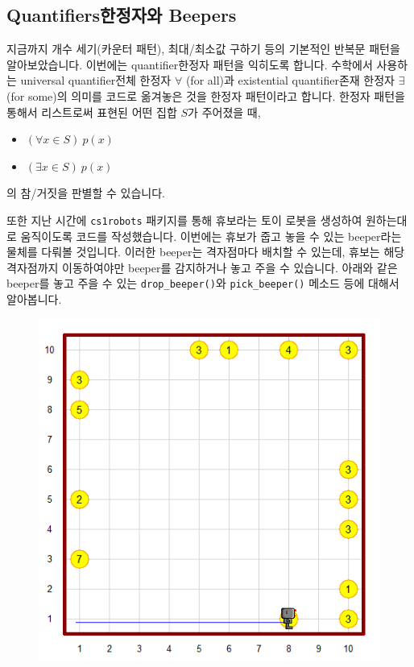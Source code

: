 \documentclass[../main.tex]{subfiles}
\begin{document}
\subsection{Quantifiers한정자와 Beepers}
지금까지 개수 세기(카운터 패턴), 최대/최소값 구하기 등의 기본적인 반복문 패턴을 알아보았습니다.
이번에는 quantifier한정자 패턴을 익히도록 합니다.
수학에서 사용하는 universal quantifier전체 한정자 $\forall$ (for all)과 existential quantifier존재 한정자 $\exists$ (for some)의 의미를 코드로 옮겨놓은 것을 한정자 패턴이라고 합니다.
한정자 패턴을 통해서 리스트로써 표현된 어떤 집합 $S$가 주어졌을 때,
\begin{itemize}
\item $(\forall x \in S)\ p(x)$
\item $(\exists x \in S)\ p(x)$
\end{itemize}
의 참/거짓을 판별할 수 있습니다.

또한 지난 시간에 \texttt{cs1robots} 패키지를 통해 휴보라는 토이 로봇을 생성하여 원하는대로 움직이도록 코드를 작성했습니다.
이번에는 휴보가 줍고 놓을 수 있는 beeper라는 물체를 다뤄볼 것입니다.
이러한 beeper는 격자점마다 배치할 수 있는데, 휴보는 해당 격자점까지 이동하여야만 beeper를 감지하거나 놓고 주을 수 있습니다.
아래와 같은 beeper를 놓고 주을 수 있는 \texttt{drop\_beeper()}와 \texttt{pick\_beeper()} 메소드 등에 대해서 알아봅니다.
\begin{figure}[H]
\centering
\includegraphics[width=0.5\linewidth]{"./lectures/lecture5_beeper"}
\label{fig:lecture5beeper}
\end{figure}
\end{document}
